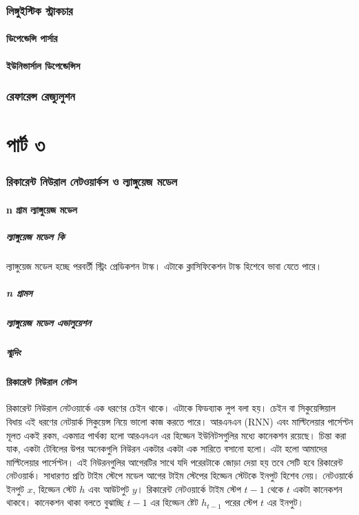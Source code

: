 \documentclass{article}[book]
\begin{document}
\section{লিঙ্গুইস্টিক স্ট্রাকচার}
\subsection{ডিপেন্ডেন্সি পার্সার}
\subsection{ইউনিভার্সাল ডিপেন্ডেন্সিস}

\section{রেফারেন্স রেজ্যুলুশন}

 \part{পার্ট ৩} 
\section{রিকারেন্ট নিউরাল নেটওয়ার্কস ও ল্যাঙ্গুয়েজ মডেল}
\subsection{n গ্রাম ল্যাঙ্গুয়েজ মডেল}
\subsubsection{ল্যাঙ্গুয়েজ মডেল কি}
ল্যাঙ্গুয়েজ মডেল হচ্ছে পরবর্তী স্ট্রিং প্রেডিকশন টাস্ক। এটাকে ক্লাসিফিকেশন টাস্ক হিশেবে ভাবা যেতে পারে।
\subsubsection{n গ্রামস}
\subsubsection{ল্যাঙ্গুয়েজ মডেল এভালুয়েশন}
\subsubsection{স্মুদিং}

\subsection{রিকারেন্ট নিউরাল নেটস}
রিকারেন্ট নিউরাল নেটওয়ার্কে \cite{6302929} এক ধরণের চেইন থাকে। এটাকে ফিডব্যাক লুপ বলা হয়। চেইন বা সিকুয়েন্সিয়াল বিধায় এই ধরণের নেটয়ার্ক সিকুয়েন্স নিয়ে ভালো কাজ করতে পারে। 
আরএনএন (RNN) এবং মাল্টিলেয়ার পার্সেপ্টন মূলত একই রকম, একমাত্র পার্থক্য হলো আরএনএন এর হিড্ডেন ইউনিটসগুলির মধ্যে কানেকশন রয়েছে।
চিন্তা করা যাক, একটা টেবিলের উপর অনেকগুলি নিউরন একটার একটা এক সারিতে বসানো হলো। এটা হলো আমাদের মাল্টিলেয়ার পার্সেপ্টন।
এই নিউরনগুলির আগেরটির সাথে যদি পরেরটাকে জোড়া দেয়া হয় তবে সেটি হবে রিকারেন্ট নেটওয়ার্ক। 
সাধারণত প্রতি টাইম স্টেপে মডেল আগের টাইম স্টেপের হিড্ডেন স্টেটকে ইনপুট হিশেব নেয়। নেটওয়ার্কে ইনপুট $x$, হিড্ডেন স্টেট $h$ এবং আউটপুট $y$। 
রিকারেন্ট নেটওয়ার্কে টাইম স্টেপ  $t-1$ থেকে $t$ একটা কানেকশন থাকবে। কানেকশন থাকা বলতে বুঝাচ্ছি $t-1$ এর হিড্ডেন ষ্টেট $h_{t-1}$ পরের স্টেপ $t$ এর ইনপুট। 
\end{document}
